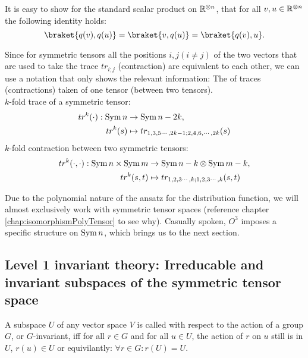 {\begin{note}[]
	It is easy to show for the standard scalar product on $\mathbb{R}^{\otimes n}$, that for all $v,u \in \mathbb{R}^{\otimes n}$ the following identity holds:
	\begin{equation}
		\braket{q(v),q(u)} = \braket{v,q(u)} = \braket{q(v),u}.
		\label{eq:scalarqprod}
	\end{equation}
\end{note}
\begin{definition}
	Since for symmetric tensors all the positions $i,j (i\neq j)$ of the two vectors that are used to take the trace $tr_{i;j}$ (contraction) are equivalent to each other, we can use a notation that only shows the relevant information: The  of traces (contractions) taken of one tensor (between two tensors). \\
	$k$-fold trace of a symmetric tensor:
	\begin{align*}
		tr^{k} (\cdot): \operatorname{Sym}{n} &\to \operatorname{Sym}{n-2k},\\
		tr^{k} (s) & \mapsto tr_{1,3,5\cdots, 2k-1;2,4,6,\cdots,2k} (s)
	\end{align*}
	$k$-fold contraction between two symmetric tensors:
	\begin{align*}
		tr^{k} (\cdot,\cdot): \operatorname{Sym}{n}\times\operatorname{Sym}{m} &\to \operatorname{Sym}{n-k}\otimes\operatorname{Sym}{m-k},\\
		tr^{k} (s,t) & \mapsto tr_{1,2,3\cdots, k;1,2,3\cdots,k} (s,t)
	\end{align*}		
\end{definition}

Due to the polynomial nature of the ansatz for the distribution function, we will almost exclusively work with symmetric tensor spaces (reference chapter \ref{chap:isomorphismPolyTensor} to see why). Casually spoken, $O^3$ imposes a specific structure on $\operatorname{Sym}{n}$, which brings us to the next section.

\subsection{Level 1 invariant theory: Irreducable and invariant subspaces of the symmetric tensor space}
\begin{definition} A subspace $U$ of any vector space $V$ is called  with respect to the action of a group $G$, or $G$-invariant, iff for all $r\in G$ and for all $u\in U$, the action of $r$ on $u$ still is in $U$, $r(u)\in U$ or equivilantly: $\forall r\in G: r(U)=U$.	
\end{definition}

}
